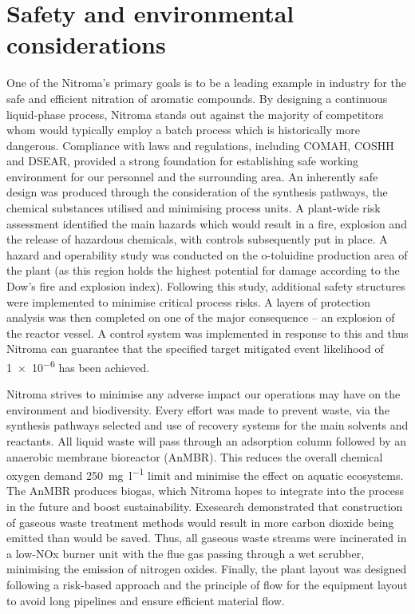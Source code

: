 \section*{Safety and environmental considerations}

 One of the Nitroma's primary goals is to be a leading example in industry for the safe and efficient nitration of aromatic compounds. By designing a continuous liquid-phase process, Nitroma stands out against the majority of competitors whom would typically employ a batch process which is historically more dangerous. Compliance with laws and regulations, including COMAH, COSHH and DSEAR, provided a strong foundation for establishing safe working environment for our personnel and the surrounding area. An inherently safe design was produced through the consideration of the synthesis pathways, the chemical substances utilised and minimising process units. A plant-wide risk assessment identified the main hazards which would result in a fire, explosion and the release of hazardous chemicals, with controls subsequently put in place. A hazard and operability study was conducted on the o-toluidine production area of the plant (as this region holds the highest potential for damage according to the Dow's fire and explosion index). Following this study, additional safety structures were implemented to minimise critical process risks. A layers of protection analysis was then completed on one of the major consequence – an explosion of the reactor vessel. A control system was implemented in response to this and thus Nitroma can guarantee that the specified target mitigated event likelihood of \num{1e-6} has been achieved.

Nitroma strives to minimise any adverse impact our operations may have on the environment and biodiversity. Every effort was made to prevent waste, via the synthesis pathways selected and use of recovery systems for the main solvents and reactants. All liquid waste will pass through an adsorption column followed by an anaerobic membrane bioreactor (AnMBR). This reduces the overall chemical oxygen demand \SI{250}{\mg\per\litre} limit and minimise the effect on aquatic ecosystems. The AnMBR produces biogas, which Nitroma hopes to integrate into the process in the future and boost sustainability. Exesearch demonstrated that construction of gaseous waste treatment methods would result in more carbon dioxide being emitted than would be saved. Thus, all gaseous waste streams were incinerated in a low-NOx burner unit with the flue gas passing through a wet scrubber, minimising the emission of nitrogen oxides. Finally, the plant layout was designed following a risk-based approach and the principle of flow for the equipment layout to avoid long pipelines and ensure efficient material flow. 